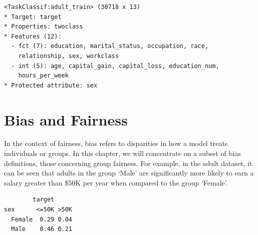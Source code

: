 \begin{Shaded}
\begin{Highlighting}[]
\OtherTok{=} \NormalTok{(}\NormalTok{)}
\end{Highlighting}
\end{Shaded}

\begin{verbatim}
<TaskClassif:adult_train> (30718 x 13)
* Target: target
* Properties: twoclass
* Features (12):
  - fct (7): education, marital_status, occupation, race,
    relationship, sex, workclass
  - int (5): age, capital_gain, capital_loss, education_num,
    hours_per_week
* Protected attribute: sex
\end{verbatim}

\hypertarget{bias-and-fairness}{%
\section{Bias and Fairness}\label{bias-and-fairness}}

In the context of fairness,
bias
refers to disparities in how a model treats individuals or groups. In
this chapter, we will concentrate on a subset of bias definitions, those
concerning group
fairness. For example, in the adult dataset, it can
be seen that adults in the group `Male' are significantly more likely to
earn a salary greater than \$50K per year when compared to the group
`Female'.

\begin{Shaded}
\begin{Highlighting}[]
\OtherTok{=} \SpecialCharTok{$}\NormalTok{(} \NormalTok{(}\NormalTok{, }\NormalTok{)))}
\NormalTok{(}\NormalTok{)}
\end{Highlighting}
\end{Shaded}

\begin{verbatim}
        target
sex      <=50K >50K
  Female  0.29 0.04
  Male    0.46 0.21
\end{verbatim}

